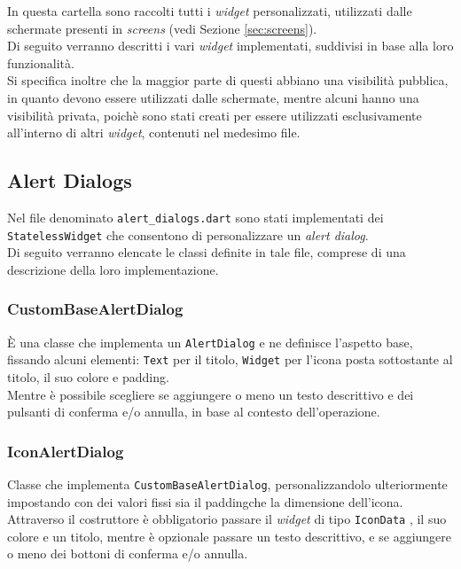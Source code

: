 In questa cartella sono raccolti tutti i \emph{widget} personalizzati, utilizzati dalle schermate presenti in \emph{screens} (vedi Sezione \ref{sec:screens}).\\
Di seguito verranno descritti i vari \emph{widget} implementati, suddivisi in base alla loro funzionalità.\\
Si specifica inoltre che la maggior parte di questi abbiano una visibilità pubblica, in quanto devono essere utilizzati dalle schermate, mentre alcuni hanno una visibilità privata, poichè sono stati creati per essere utilizzati esclusivamente all'interno di altri \emph{widget}, contenuti nel medesimo file.

\subsection{Alert Dialogs}
\label{subsec:alert-dialogs}

Nel file denominato \lstinline{alert_dialogs.dart} sono stati implementati dei \lstinline{StatelessWidget} che consentono di personalizzare un \emph{alert dialog}.\\
Di seguito verranno elencate le classi definite in tale file, comprese di una descrizione della loro implementazione.

\subsubsection*{CustomBaseAlertDialog}
\label{subsubsec:custom-base-alert-dialog}

È una classe che implementa un \lstinline{AlertDialog} \cite{site:alert-dialog} e ne definisce l'aspetto base, fissando alcuni elementi: \lstinline{Text} \cite{site:text} per il titolo, \lstinline{Widget} per l'icona posta sottostante al titolo, il suo colore e \gls{padding}\glsoccur.\\
Mentre è possibile scegliere se aggiungere o meno un testo descrittivo e dei pulsanti di conferma e/o annulla, in base al contesto dell'operazione.

\subsubsection*{IconAlertDialog}
\label{subsubsec:icon-alert-dialog}

Classe che implementa \lstinline{CustomBaseAlertDialog}, personalizzandolo ulteriormente impostando con dei valori fissi sia il \gls{padding}\glsoccur che la dimensione dell'icona.\\
Attraverso il costruttore è obbligatorio passare il \emph{widget} di tipo \lstinline{IconData} \cite{site:icon-data}, il suo colore e un titolo, mentre è opzionale passare un testo descrittivo, e se aggiungere o meno dei bottoni di conferma e/o annulla.

